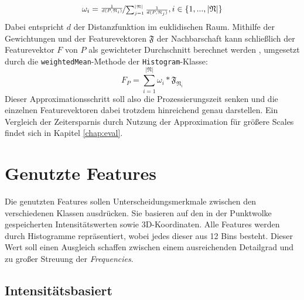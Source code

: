 \begin{equation}
    \omega_i = \nicefrac{\frac{1}{d(P, \mathfrak{N}_i)}}{\sum_{j = 1}^{|\mathfrak{N}|}{\frac{1}{d(P, \mathfrak{N}_j)}}}, i \in \{1, ..., |\mathfrak{N}|\}
\end{equation}
Dabei entspricht $d$ der Distanzfunktion im euklidischen Raum. Mithilfe der Gewichtungen und der Featurevektoren $\mathfrak{F}$ der Nachbarschaft kann schließlich der Featurevektor $F$ von $P$ als gewichteter Durchschnitt berechnet werden \citep{Rusu.etal-2009}, umgesetzt durch die \texttt{weightedMean}-Methode der \texttt{Histogram}-Klasse:
\begin{equation}
    F_P = \sum\limits_{i = 1}^{|\mathfrak{N}|}{\omega_i * \mathfrak{F}_{\mathfrak{N}_i}}
\end{equation}
Dieser Approximationsschritt soll also die Prozessierungszeit senken und die einzelnen Featurevektoren dabei trotzdem hinreichend genau darstellen. Ein Vergleich der Zeitersparnis durch Nutzung der Approximation für größere Scales findet sich in Kapitel \ref{chap:eval}.

\section{Genutzte Features}

Die genutzten Features sollen Unterscheidungsmerkmale zwischen den verschiedenen Klassen ausdrücken. Sie basieren auf den in der Punktwolke gespeicherten Intensitätswerten sowie 3D-Koordinaten. Alle Features werden durch Histogramme repräsentiert, wobei jedes dieser aus 12 Bins besteht. Dieser Wert soll einen Ausgleich schaffen zwischen einem ausreichenden Detailgrad und zu großer Streuung der \textit{Frequencies}.

\subsection*{Intensitätsbasiert}

